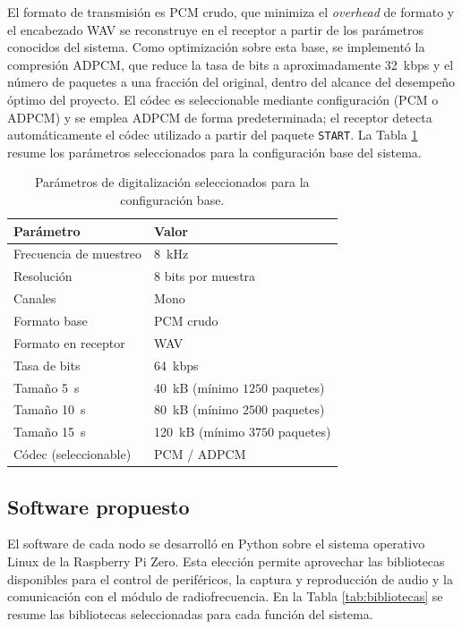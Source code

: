 El formato de transmisión es PCM crudo, que minimiza el \textit{overhead} de formato y el encabezado WAV se reconstruye en el receptor a partir de los parámetros conocidos del sistema.
Como optimización sobre esta base, se implementó la compresión ADPCM, que reduce la tasa de bits a aproximadamente \SI{32}{kbps} y el número de paquetes a una fracción del original, dentro del alcance del desempeño óptimo del proyecto.
El códec es seleccionable mediante configuración (PCM o ADPCM) y se emplea ADPCM de forma predeterminada; el receptor detecta automáticamente el códec utilizado a partir del paquete \texttt{START}.
La Tabla \ref{tab:params_audio} resume los parámetros seleccionados para la configuración base del sistema.

\begin{table}[htb]
\centering
\caption{Parámetros de digitalización seleccionados para la configuración base.}
\label{tab:params_audio}
\begin{tabular}{@{}lp{5.5cm}@{}}
\toprule
Parámetro & Valor \\
\midrule
Frecuencia de muestreo  & \SI{8}{\kilo\hertz} \\
Resolución              & $8$ bits por muestra \\
Canales                 & Mono \\
\addlinespace
Formato base            & PCM crudo \\
Formato en receptor     & WAV \\
\addlinespace
Tasa de bits            & \SI{64}{kbps} \\
Tamaño \SI{5}{\second}  & \SI{40}{kB} (mínimo $1250$ paquetes) \\
Tamaño \SI{10}{\second} & \SI{80}{kB} (mínimo $2500$ paquetes) \\
Tamaño \SI{15}{\second} & \SI{120}{kB} (mínimo $3750$ paquetes) \\
\addlinespace
Códec (seleccionable)   & PCM / ADPCM \\
\bottomrule
\end{tabular}
\end{table}

\subsection{Software propuesto}

El software de cada nodo se desarrolló en Python sobre el sistema operativo Linux de la Raspberry Pi Zero.
Esta elección permite aprovechar las bibliotecas disponibles para el control de periféricos, la captura y reproducción de audio y la comunicación con el módulo de radiofrecuencia.
En la Tabla \ref{tab:bibliotecas} se resume las bibliotecas seleccionadas para cada función del sistema.

